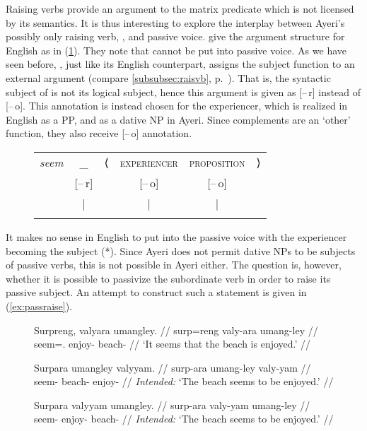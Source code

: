 Raising verbs provide an argument to the matrix predicate which is not licensed
by its semantics. It is thus interesting to explore the interplay between
Ayeri's possibly only raising verb, , and passive
voice. \citet{bresnan2016} give the argument structure for English  as
in (\ref{ex:engseemastruct}). They note that  cannot be put into
passive voice. As we have seen before, , just like its
English counterpart, assigns the subject function to an external argument
(compare \autoref{subsubsec:raisvb}, p.~\pageref{subsubsec:raisvb}). That is,
the syntactic subject of  is not its logical subject, hence this
argument is given as [–\,r] instead of [–\,o]. This annotation is instead
chosen for the experiencer, which is realized in English as a PP, and as a
dative NP in Ayeri. Since complements are an `other' function, they also
receive [–\,o] annotation.

\begin{figure}
\ex\label{ex:engseemastruct}
\begin{tabular}[t]{@{} >{\itshape}l c l c c r}
seem
	& \_
	& ⟨
	& \textsc{experiencer}
	& \textsc{proposition}
	& ⟩
	\\
%
	& [–\,r]
	& %
	& [–\,o]
	& [–\,o]
	& %
	\\

%
	& |
	& %
	& |
	& |
	& %
	\\

%
	& \Subj
	& %
	& \Oblq{exp}
	& \XCompl
	& %
	\\
\end{tabular}

\xe
\end{figure}

It makes no sense in English to put  into the passive voice with the
experiencer becoming the subject (*). Since Ayeri does not
permit dative NPs to be subjects of passive verbs, this is not possible in
Ayeri either. The question is, however, whether it is possible to passivize the
subordinate verb in order to raise its passive subject. An attempt to construct
such a statement is given in (\ref{ex:passraise}).

\begin{figure}
\pex\label{ex:passraise}
\a\label{ex:passraise_1}\begingl
	\gla Surpreng, valyara umangley. //
	\glb surp=reng valy-ara umang-ley //
	\glc seem=\TsgI{}.\Aarg{} enjoy-\TsgI{} beach-\PargI{} //
	\glft `It seems that the beach is enjoyed.' //
\endgl

\a\label{ex:passraise_2}\ljudge*\begingl
	\gla Surpara umangley valyyam. //
	\glb surp-ara umang-ley valy-yam //
	\glc seem-\TsgI{} beach-\PargI{} enjoy-\Ptcp{} //
	\glft \textit{Intended:} `The beach seems to be enjoyed.' //
\endgl

\a\label{ex:passraise_3}\ljudge*\begingl
	\gla Surpara valyyam umangley. //
	\glb surp-ara valy-yam umang-ley //
	\glc seem-\TsgI{} enjoy-\Ptcp{} beach-\PargI{} //
	\glft \textit{Intended:} `The beach seems to be enjoyed.' //
\endgl
\xe
\end{figure}

